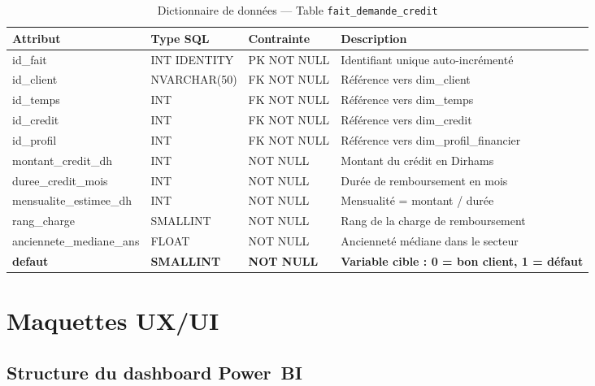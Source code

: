 \documentclass[12pt, a4paper]{report}
\begin{document}
\begin{table}[H]
\centering
\caption{Dictionnaire de données --- Table \texttt{fait\_demande\_credit}}
\label{tab:dico}
\renewcommand{\arraystretch}{1.8}
\begin{tabularx}{\textwidth}{p{4.5cm} p{2.9cm} p{2cm} X}
\toprule
\rowcolor{primary!12}
Attribut & Type SQL & Contrainte & Description \\
\midrule
id\_fait                 & INT IDENTITY  & PK NOT NULL & Identifiant unique auto-incrémenté \\
id\_client               & NVARCHAR(50)  & FK NOT NULL & Référence vers dim\_client \\
id\_temps                & INT           & FK NOT NULL & Référence vers dim\_temps \\
id\_credit               & INT           & FK NOT NULL & Référence vers dim\_credit \\
id\_profil               & INT           & FK NOT NULL & Référence vers dim\_profil\_financier \\
montant\_credit\_dh      & INT           & NOT NULL    & Montant du crédit en Dirhams \\
duree\_credit\_mois      & INT           & NOT NULL    & Durée de remboursement en mois \\
mensualite\_estimee\_dh  & INT           & NOT NULL    & Mensualité = montant / durée \\
rang\_charge             & SMALLINT      & NOT NULL    & Rang de la charge de remboursement \\
anciennete\_mediane\_ans & FLOAT         & NOT NULL    & Ancienneté médiane dans le secteur \\
\textbf{defaut}          & \textbf{SMALLINT} & \textbf{NOT NULL} & \textbf{Variable cible : 0 = bon client, 1 = défaut} \\
\bottomrule
\end{tabularx}
\end{table}

\section{Maquettes UX/UI}

\subsection{Structure du dashboard Power~BI}
\end{document}
